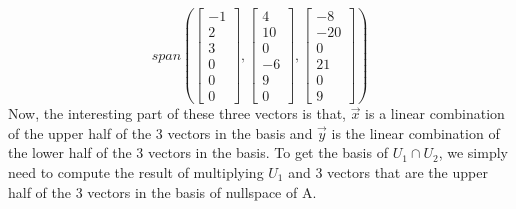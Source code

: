 \documentclass[12pt]{article}
\begin{document}
            \begin{equation*}
                span\left(
                    \left[\begin{matrix}
                        -1\\
                        2\\
                        3\\
                        0\\
                        0\\
                        0
                    \end{matrix}\right], 
                    \left[\begin{matrix}
                        4\\
                        10\\
                        0\\
                        -6\\
                        9\\
                        0
                    \end{matrix}\right],
                    \left[\begin{matrix}
                        -8\\
                        -20\\
                        0\\
                        21\\
                        0\\
                        9
                    \end{matrix}\right]
                \right)
            \end{equation*}
            Now, the interesting part of these three vectors is that, $\vec{x}$ is a linear combination of the upper half of the 3 vectors in the basis and $\vec{y}$ is the linear combination of the lower half of the 3 vectors in the basis.
            To get the basis of $U_1 \cap U_2$, we simply need to compute the result of multiplying $U_1$ and 3 vectors that are the upper half of the 3 vectors in the basis of nullspace of A.
\end{document}
